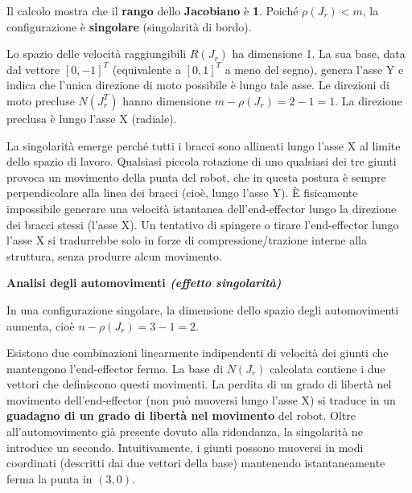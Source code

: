 \documentclass[11pt, a4paper]{article}
\begin{document}
\begin{par}
\begin{flushleft}
Il calcolo mostra che il \textbf{rango} dello \textbf{Jacobiano} è \textbf{1}. Poiché $\rho(J_r)<m$, la configurazione è \textbf{singolare} (singolarità di bordo).

Lo spazio delle velocità raggiungibili $R(J_r)$ ha dimensione 1. La sua base, data dal vettore $[0,-1]^T$ (equivalente a $[0,1]^T$ a meno del segno), genera l'asse Y e indica che l'unica direzione di moto possibile è lungo tale asse. Le direzioni di moto precluse $N(J_r^T)$ hanno dimensione $m - \rho(J_r) = 2-1 = 1$. La direzione preclusa è lungo l'asse X (radiale).

La singolarità emerge perché tutti i bracci sono allineati lungo l'asse X al limite dello spazio di lavoro. Qualsiasi piccola rotazione di uno qualsiasi dei tre giunti provoca un movimento della punta del robot, che in questa postura è sempre perpendicolare alla linea dei bracci (cioè, lungo l'asse Y). È fisicamente impossibile generare una velocità istantanea dell'end-effector lungo la direzione dei bracci stessi (l'asse X). Un tentativo di spingere o tirare l'end-effector lungo l'asse X si tradurrebbe solo in forze di compressione/trazione interne alla struttura, senza produrre alcun movimento.
\end{flushleft}
\end{par}

\begin{par}
\begin{flushleft}
\textbf{Analisi degli automovimenti \textit{(effetto singolarità)}}
\end{flushleft}
\end{par}

\begin{par}
\begin{flushleft}
In una configurazione singolare, la dimensione dello spazio degli automovimenti aumenta, cioè $n - \rho(J_r) = 3-1 = 2$.

Esistono due combinazioni linearmente indipendenti di velocità dei giunti che mantengono l'end-effector fermo. La base di $N(J_r)$ calcolata contiene i due vettori che definiscono questi movimenti. La perdita di un grado di libertà nel movimento dell'end-effector (non può muoversi lungo l'asse X) si traduce in un \textbf{guadagno di un grado di libertà nel movimento} del robot. Oltre all'automovimento già presente dovuto alla ridondanza, la singolarità ne introduce un secondo. Intuitivamente, i giunti possono muoversi in modi coordinati (descritti dai due vettori della base) mantenendo istantaneamente ferma la punta in $(3,0)$.
\end{flushleft}
\end{par}
\end{document}
